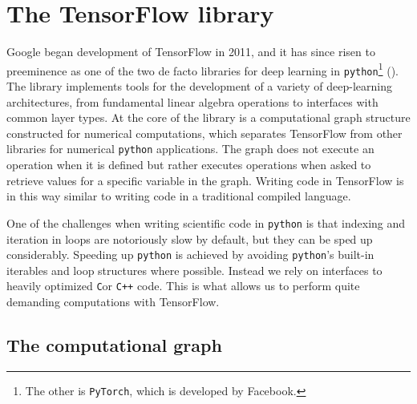 \section{The TensorFlow library}\label{sec:TensorFlow}

Google began development of TensorFlow in 2011, and it has since risen to preeminence as one of the two de facto libraries for deep learning in \lstinline{python}\footnote{The other is \lstinline{PyTorch}, which is developed by Facebook.} (\cite{tensorflow}). The library implements tools for the development of a variety of deep-learning architectures, from fundamental linear algebra operations to interfaces with common layer types. At the core of the library is a computational graph structure constructed for numerical computations, which separates TensorFlow from other libraries for numerical \lstinline{python} applications. The graph does not execute an operation when it is defined but rather executes operations when asked to retrieve values for a specific variable in the graph. Writing code in TensorFlow is in this way similar to writing code in a traditional compiled language.

One of the challenges when writing scientific code in \lstinline{python} is that indexing and iteration in loops are notoriously slow by default, but they can be sped up considerably. Speeding up \lstinline{python} is achieved by avoiding \lstinline{python}'s built-in iterables and loop structures where possible. Instead we rely on interfaces to heavily optimized \lstinline{C}or \lstinline{C++} code. This is what allows us to perform quite demanding computations with TensorFlow.

\subsection{The computational graph}

